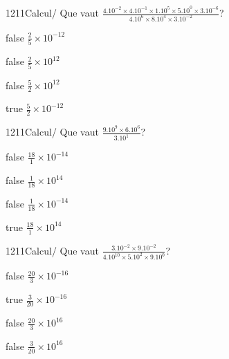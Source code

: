 \documentclass[11pt]{article}
\begin{document}
            \begin{question}{1211}{Calcul}{}{/}
                Que vaut $\frac{4.10^{-2}\times 4.10^{-1}\times 1.10^{5}\times 5.10^{0}\times 3.10^{-6}}{4.10^{6}\times 8.10^{4}\times 3.10^{-2}}$?
            \end{question}
            
            \begin{reponses}
                \item[false] $\frac{2}{5}\times 10^{-12}$
                \item[false] $\frac{2}{5}\times 10^{12}$
                \item[false] $\frac{5}{2}\times 10^{12}$
                \item[true] $\frac{5}{2}\times 10^{-12}$
            \end{reponses}
            
            \begin{question}{1211}{Calcul}{}{/}
                Que vaut $\frac{9.10^{9}\times 6.10^{6}}{3.10^{1}}$?
            \end{question}
            
            \begin{reponses}
                \item[false] $\frac{18}{1}\times 10^{-14}$
                \item[false] $\frac{1}{18}\times 10^{14}$
                \item[false] $\frac{1}{18}\times 10^{-14}$
                \item[true] $\frac{18}{1}\times 10^{14}$
            \end{reponses}
            
            \begin{question}{1211}{Calcul}{}{/}
                Que vaut $\frac{3.10^{-2}\times 9.10^{-2}}{4.10^{10}\times 5.10^{2}\times 9.10^{0}}$?
            \end{question}
            
            \begin{reponses}
                \item[false] $\frac{20}{3}\times 10^{-16}$
                \item[true] $\frac{3}{20}\times 10^{-16}$
                \item[false] $\frac{20}{3}\times 10^{16}$
                \item[false] $\frac{3}{20}\times 10^{16}$
            \end{reponses}
            
\end{document}
